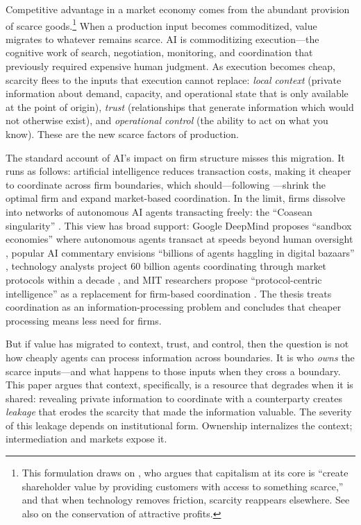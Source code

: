 \documentclass[12pt]{article}
\theoremstyle{definition}
\begin{document}
Competitive advantage in a market economy comes from the abundant provision of scarce goods.\footnote{This formulation draws on \citet{danco2017}, who argues that capitalism at its core is ``create shareholder value by providing customers with access to something scarce,'' and that when technology removes friction, scarcity reappears elsewhere. See also \citet{christensen1997} on the conservation of attractive profits.} When a production input becomes commoditized, value migrates to whatever remains scarce. AI is commoditizing execution---the cognitive work of search, negotiation, monitoring, and coordination that previously required expensive human judgment. As execution becomes cheap, scarcity flees to the inputs that execution cannot replace: \textit{local context} (private information about demand, capacity, and operational state that is only available at the point of origin), \textit{trust} (relationships that generate information which would not otherwise exist), and \textit{operational control} (the ability to act on what you know). These are the new scarce factors of production.

The standard account of AI's impact on firm structure misses this migration. It runs as follows: artificial intelligence reduces transaction costs, making it cheaper to coordinate across firm boundaries, which should---following \citet{coase1937}---shrink the optimal firm and expand market-based coordination. In the limit, firms dissolve into networks of autonomous AI agents transacting freely: the ``Coasean singularity'' \citep{shahidi2025}. This view has broad support: Google DeepMind proposes ``sandbox economies'' where autonomous agents transact at speeds beyond human oversight \citep{tomasev2025}, popular AI commentary envisions ``billions of agents haggling in digital bazaars'' \citep{shapiro2024}, technology analysts project 60 billion agents coordinating through market protocols within a decade \citep{azhar2024}, and MIT researchers propose ``protocol-centric intelligence'' as a replacement for firm-based coordination \citep{chopra2024}. The thesis treats coordination as an information-processing problem and concludes that cheaper processing means less need for firms.

But if value has migrated to context, trust, and control, then the question is not how cheaply agents can process information across boundaries. It is who \textit{owns} the scarce inputs---and what happens to those inputs when they cross a boundary. This paper argues that context, specifically, is a resource that degrades when it is shared: revealing private information to coordinate with a counterparty creates \textit{leakage} that erodes the scarcity that made the information valuable. The severity of this leakage depends on institutional form. Ownership internalizes the context; intermediation and markets expose it.
\end{document}
